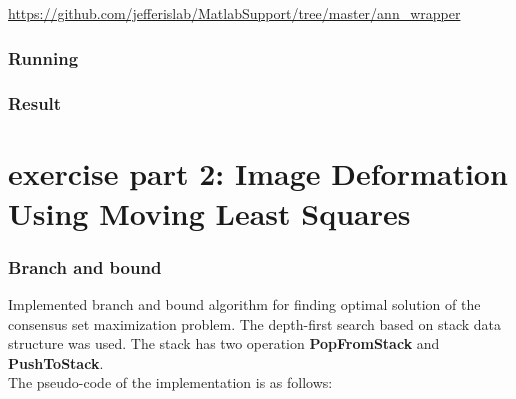 \documentclass[paper=a4, fontsize=11pt]{scrartcl} %
\numberwithin{equation}{section} %
\numberwithin{figure}{section} %
\numberwithin{table}{section} %
\newcommand{\funcname}[1]{\textbf{#1}}
\begin{document}
\url{https://github.com/jefferislab/MatlabSupport/tree/master/ann_wrapper}

\subsubsection{Running}

\subsubsection{Result}


\section{exercise part 2: Image Deformation Using Moving Least Squares}


\subsubsection{Branch and bound}

Implemented branch and bound algorithm for finding optimal solution of the consensus set maximization problem. The depth-first search based on stack data structure was used. The stack has two operation \funcname{PopFromStack} and \funcname{PushToStack}. \\

The pseudo-code of the implementation is as follows: 
\end{document}
